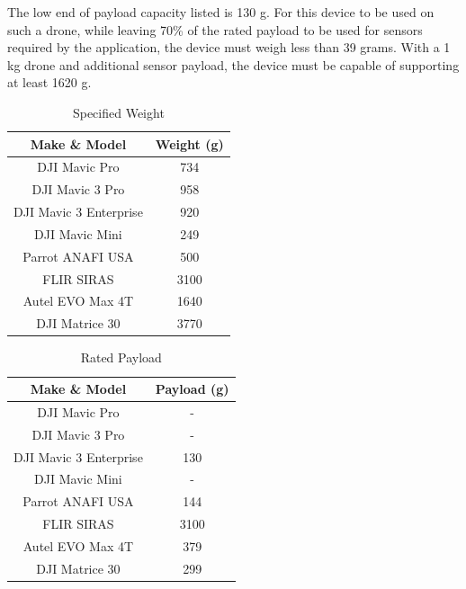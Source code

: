 \documentclass{article}
\begin{document}
The low end of payload capacity listed is 130 g. For this device to be used on such a drone, while leaving 70\% of the rated payload to be used for 
sensors required by the application, the device must weigh less than 39 grams. With a 1 kg drone and additional sensor payload, the device must be capable of supporting
at least 1620 g.


\begin{table}[H]
    \centering
    \caption{Specified Weight}
    \begin{tabular}{| c | c |}
        \hline
        {Make \& Model} & Weight (g) \\
        \hline
        DJI Mavic Pro & 734 \\
        DJI Mavic 3 Pro & 958 \\
        DJI Mavic 3 Enterprise & 920 \\
        DJI Mavic Mini & 249 \\
        Parrot ANAFI USA & 500 \\
        FLIR SIRAS & 3100 \\
        Autel EVO Max 4T & 1640 \\
        DJI Matrice 30 & 3770 \\
        \hline
    \end{tabular}
    \label{tab:weights}
\end{table}


\begin{table}[H]
    \centering
    \caption{Rated Payload}
    \begin{tabular}{| c | c |}
        \hline
        {Make \& Model} & Payload (g) \\
        \hline
        DJI Mavic Pro & - \\
        DJI Mavic 3 Pro & - \\
        DJI Mavic 3 Enterprise & 130 \\
        DJI Mavic Mini & - \\
        Parrot ANAFI USA & 144 \\
        FLIR SIRAS & 3100 \\
        Autel EVO Max 4T & 379 \\
        DJI Matrice 30 & 299 \\
        \hline
    \end{tabular}
    \label{tab:payload}
\end{table}
\end{document}
